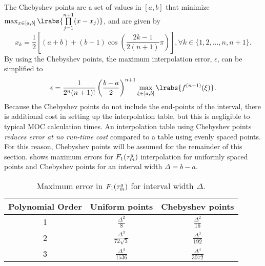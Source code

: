 {{{{        The Chebyshev points \cite{Stewart1996} are a set of values in $[a,b]$ that minimize $\max_{x\in[a,b]}\lrabs{\prodl[j=1][n+1](x-x_j)}$, and are given by
        \begin{equation}\label{eq:LSMOC:ET:Chebyshev Points}
          x_k = \frac{1}{2}\left[(a+b)+(b-1)\cos\left(\frac{2k-1}{2(n+1)}\pi\right)\right], \forall k\in\{1,2,...,n,n+1\}.
        \end{equation}
        By using the Chebyshev points, the maximum interpolation error, $\epsilon$, can be simplified to
        \begin{equation}\label{eq:LSMOC:ET:Chebyshev Interpolation Error}
          \epsilon = \frac{1}{2^n(n+1)!}\left(\frac{b-a}{2}\right)^{n+1}\max_{\xi\in[a,b]}\lrabs{f^{(n+1)}(\xi)}.
        \end{equation}
        Because the Chebyshev points do not include the end-points of the interval, there is additional cost in setting up the interpolation table, but this is negligible to typical \ac{MOC} calculation times.
        An interpolation table using Chebyshev points \emph{reduces error at no run-time cost} compared to a table using evenly spaced points.
        For this reason, Chebyshev points will be assumed for the remainder of this section.
         shows maximum errors for $F_1(\opt)$ interpolation for uniformly spaced points and Chebyshev points for an interval width $\Delta=b-a$.
        \begin{table}
          \centering
          \renewcommand{\arraystretch}{1.45}
          \caption{Maximum error in $F_1(\opt)$ for interval width $\Delta$.}
          \label{tab:LSMOC:ET:Chebyshev Error}
          \begin{tabular}{@{}ccc@{}}\toprule
            Polynomial Order & Uniform points   & Chebyshev points\\\midrule
            1                & $\frac{\Delta^2}{8}$           & $\frac{\Delta^2}{16}$\\
            2                & $\frac{\Delta^3}{72\sqrt{3}}$  & $\frac{\Delta^3}{192}$\\
            3                & $\frac{\Delta^4}{1536}$        & $\frac{\Delta^4}{3072}$\\\bottomrule
          \end{tabular}
        \end{table}
      }
}}}
